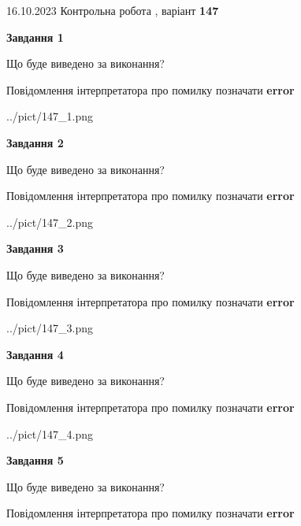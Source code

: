 \documentclass[12pt, ukrainian]{article}
\begin{document}
{\Large{16.10.2023 Контрольна робота , варіант  \No \textbf { 147 }\par}}
{
\begin {large}
{\begin {center}\textbf{Завдання 1}\end {center}}\par
Що буде виведено за виконання? \par
Повідомлення інтерпретатора про помилку позначати \textbf{error}

\begin{center}
	{../pict/147_1.png}
\end{center}
\newpage

{\begin {center}\textbf{Завдання 2}\end {center}}\par
Що буде виведено за виконання? \par
Повідомлення інтерпретатора про помилку позначати \textbf{error}

\begin{center}
	{../pict/147_2.png}
\end{center}
\newpage

{\begin {center}\textbf{Завдання 3}\end {center}}\par
Що буде виведено за виконання? \par
Повідомлення інтерпретатора про помилку позначати \textbf{error}

\begin{center}
	{../pict/147_3.png}
\end{center}
\newpage

{\begin {center}\textbf{Завдання 4}\end {center}}\par
Що буде виведено за виконання? \par
Повідомлення інтерпретатора про помилку позначати \textbf{error}

\begin{center}
	{../pict/147_4.png}
\end{center}
\newpage

{\begin {center}\textbf{Завдання 5}\end {center}}\par
Що буде виведено за виконання? \par
Повідомлення інтерпретатора про помилку позначати \textbf{error}


\end{large}}
\end{document}
